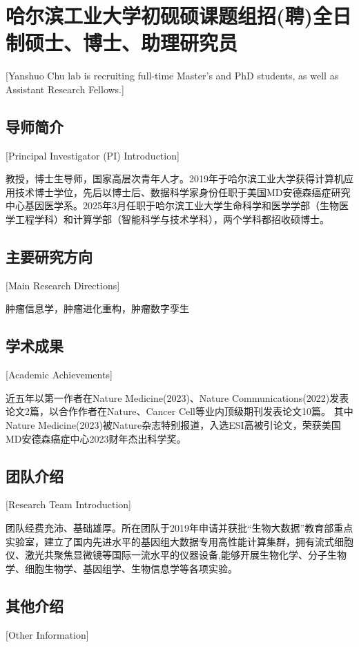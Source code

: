 
\chapter{哈尔滨工业大学初砚硕课题组招(聘)全日制硕士、博士、助理研究员}[Yanshuo Chu lab is recruiting full-time Master’s and PhD students, as well as Assistant Research Fellows.]

\section{导师简介}[Principal Investigator (PI) Introduction]

教授，博士生导师，国家高层次青年人才。2019年于哈尔滨工业大学获得计算机应用技术博士学位，先后以博士后、数据科学家身份任职于美国MD安德森癌症研究中心基因医学系。2025年3月任职于哈尔滨工业大学生命科学和医学学部（生物医学工程学科）和计算学部（智能科学与技术学科），两个学科都招收硕博士。

\section{主要研究方向}[Main Research Directions]

肿瘤信息学，肿瘤进化重构，肿瘤数字孪生

\section{学术成果}[Academic Achievements]

近五年以第一作者在Nature Medicine(2023)、Nature Communications(2022)发表论文2篇，以合作作者在Nature、Cancer Cell等业内顶级期刊发表论文10篇。
其中Nature Medicine(2023)被Nature杂志特别报道，入选ESI高被引论文，荣获美国MD安德森癌症中心2023财年杰出科学奖。

\section{团队介绍}[Research Team Introduction]

团队经费充沛、基础雄厚。所在团队于2019年申请并获批“生物大数据”教育部重点实验室，建立了国内先进水平的基因组大数据专用高性能计算集群，拥有流式细胞仪、激光共聚焦显微镜等国际一流水平的仪器设备,能够开展生物化学、分子生物学、细胞生物学、基因组学、生物信息学等各项实验。

\section{其他介绍}[Other Information]


